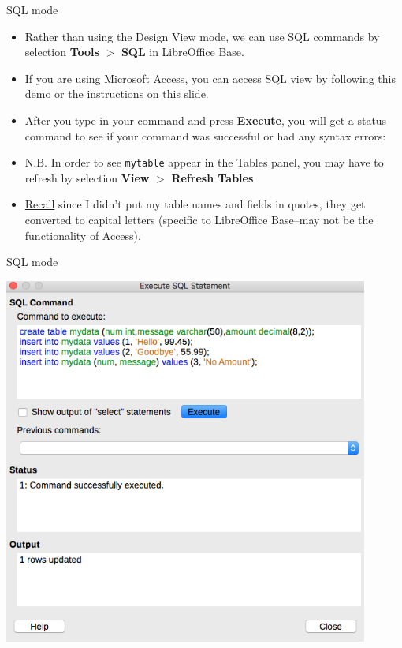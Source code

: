 \documentclass[xcolor=svgnames]{beamer}
\theoremstyle{example}
\begin{document}
\begin{frame}{SQL mode}
\begin{itemize}
\item Rather than using the Design View mode, we can use SQL commands by selection {\bf Tools} $>$ {\bf SQL} in LibreOffice Base.
\medskip
\item If you are using Microsoft Access, you can access SQL view by following \href{https://www.youtube.com/watch?v=IqGXE2nZZ9o}{this} demo or the instructions on \hyperlink{SQLaccess}{this} slide.
\medskip
\item  After you type in your command and press {\bf Execute}, you will get a status command to see if your command was successful or had any syntax errors:
\medskip
\item N.B. In order to see {\tt mytable} appear in the Tables panel, you may have to refresh by selection {\bf View} $>$ {\bf Refresh Tables} 
\medskip
\item \href{https://eeperry.wordpress.com/2013/11/15/libreoffice-base-sql-creating-tables/}{Recall} since I didn't put my table names and fields in quotes, they get converted to capital letters (specific to LibreOffice Base--may not be the functionality of Access).
\end{itemize}

\end{frame}

\begin{frame}{SQL mode}
\begin{center}
\includegraphics[width=0.9\textwidth]{img/SQLBASE}
\end{center}
\end{frame}
\end{document}
